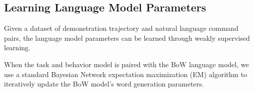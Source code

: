 \documentclass[conference]{IEEEtran}
\begin{document}
\subsection{Learning Language Model Parameters}
Given a dataset of demonstration trajectory and natural language command pairs, the language model parameters can be learned through weakly supervised learning. 

When the task and behavior model is paired with the BoW language model, we use a standard Bayesian Network expectation maximization (EM) algorithm \cite{dempster77} to iteratively update the BoW model's word generation parameters. 
\end{document}
